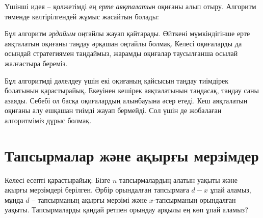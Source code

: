 Үшінші идея -- қолжетімді ең 
\emph{ерте} \emph{аяқталатын}
оқиғаны алып отыру. Алгоритм төменде келтірілгендей
жұмыс жасайтын болады:
\begin{center}
\end{center}

Бұл алгоритм \emph{әрдайым} оңтайлы жауап қайтарады. 
Өйткені мүмкіндігінше ерте аяқталатын 
оқиғаны таңдау әрқашан оңтайлы болмақ.
Келесі оқиғаларды да осындай стратегиямен
таңдаймыз, жарамды оқиғалар
таусылғанша осылай жалғастыра береміз.

Бұл алгоритмді дәлелдеу үшін екі оқиғаның
қайсысын таңдау тиімдірек болатынын қарастырайық.
Екеуінен кешірек аяқталатынын таңдасақ,
таңдау саны азаяды. Себебі ол басқа оқиғалардың
алынбауына әсер етеді.
Кеш аяқталатын оқиғаны алу ешқашан тиімді жауап 
бермейді. Сол үшін де жобалаған алгоритміміз дұрыс болмақ.

\section{Тапсырмалар және ақырғы мерзімдер}

Келесі есепті қарастырайық:
Бізге $n$ тапсырмалардың алатын уақыты және
ақырғы мерзімдері берілген. 
Әрбір орындалған тапсырмаға $d-x$ ұпай аламыз,
мұнда $d$ -- тапсырманың ақырғы мерзімі және $x$-тапсырманың 
орындалған уақыты. Тапсырмаларды қандай
ретпен орындау арқылы ең көп ұпай аламыз?

